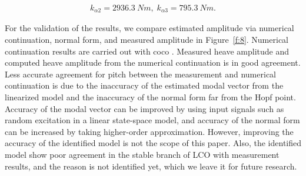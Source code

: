 \documentclass[openacc]{rsproca_new}%
\newcommand{\Fref}[1]{Figure~\ref{#1}}
\begin{document}
\begin{align}\label{eq:2-15}
k_{\alpha2}=2936.3 \: Nm, \; k_{\alpha3}=795.3 \: Nm.
\end{align}

\noindent For the validation of the results, we compare estimated amplitude via numerical continuation, normal form, and measured amplitude in \Fref{f:8}. Numerical continuation results are carried out with coco \cite{dankowicz2013recipes}. Measured heave amplitude and computed heave amplitude from the numerical continuation is in good agreement. Less accurate agreement for pitch between the measurement and numerical continuation is due to the inaccuracy of the estimated modal vector from the linearized model and the inaccuracy of the normal form far from the Hopf point. Accuracy of the modal vector can be improved by using input signals such as random excitation in a linear state-space model, and accuracy of the normal form can be increased by taking higher-order approximation. However, improving the accuracy of the identified model is not the scope of this paper. Also, the identified model show poor agreement in the stable branch of LCO with measurement results, and the reason is not identified yet, which we leave it for future research.
\end{document}
